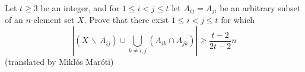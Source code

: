 Let $t\ge 3$ be an integer, and for $1\le i <j\le t$ let $A_{ij}=A_{ji}$ be an arbitrary subset of an $n$-element set $X$. Prove that there exist $1\le i < j\le t$ for which
$$\left| \left( X\,\backslash\, A_{ij}\right) \cup \bigcup_{k\neq i,j}\left( A_{ik}\cap A_{jk}\right) \right| \ge \frac{t-2}{2t-2}n$$
(translated by Miklós Maróti)